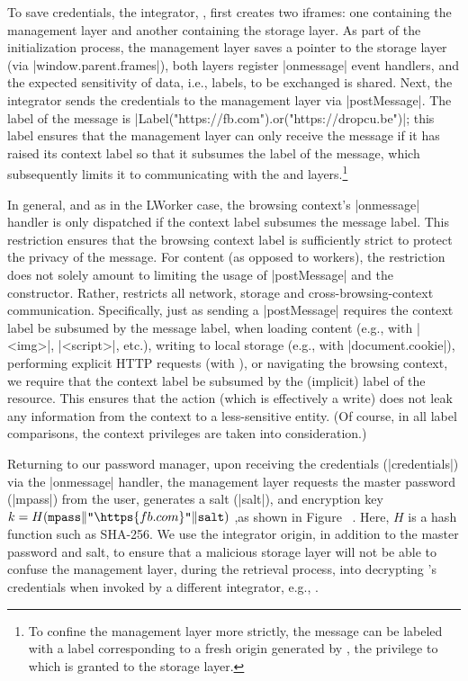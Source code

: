 %
To save credentials, the integrator, , first creates two
iframes: one containing the  management layer and
another containing the  storage layer.
%
As part of the initialization process, the management layer saves a
pointer to the storage layer (via \js|window.parent.frames|), both
layers register \js|onmessage| event handlers, and the expected
sensitivity of data, i.e., labels, to be exchanged is shared.
%
Next, the integrator sends the credentials to the management
layer via \js|postMessage|.
%
The label of the message is
\js|Label("https://fb.com").or("https://dropcu.be")|; this label
ensures that the management layer can only receive the message if it
has raised its context label so that it subsumes the label of the
message, which subsequently limits it to communicating with the
 and  layers.\footnote{
  To confine the management layer more strictly, the message can be
  labeled with a label corresponding to a fresh origin generated by
  , the privilege to which is granted to the storage
  layer. 
}

In general, and as in the LWorker case, the browsing context's
\js|onmessage| handler is only dispatched if the context label
subsumes the message label.
%
This restriction ensures that the browsing context label is
sufficiently strict to protect the privacy of the message.
%
For content (as opposed to workers), the restriction does not solely
amount to limiting the usage of \js|postMessage| and the \xhr{}
constructor.
%
Rather, \sys{} restricts all network, storage and
cross-browsing-context communication.
%
Specifically, just as sending a \js|postMessage| requires the context
label be subsumed by the message label, when loading content (e.g.,
with \js|<img>|, \js|<script>|, etc.), writing to local storage (e.g.,
with \js|document.cookie|), performing explicit HTTP requests (with
\xhr{}), or navigating the browsing context, we require that the
context label be subsumed by the (implicit) label of the resource.
%
This ensures that the action (which is effectively a write) does not
leak any information from the context to a less-sensitive entity.
%
(Of course, in all label comparisons, the context privileges are taken
into consideration.)
%
 
Returning to our password manager, upon receiving the credentials
(\js|credentials|) via the \js|onmessage| handler, the management
layer requests the master password (\js|mpass|) from the user, 
generates a salt (\js|salt|), and encryption key $k =
H(\texttt{mpass}\|\texttt{"}\https{fb.com}\texttt{"}\|\texttt{salt})$
\iffigures
\ifcompletefigures
,as shown in Figure~
\fi
\fi
.
%
Here, $H$ is a hash function such as SHA-256.
%
We use the integrator origin, in addition to the master password and
salt, to ensure that a malicious storage layer will not be able to
confuse the management layer, during the retrieval process, into
decrypting 's credentials when invoked by a different
integrator, e.g., .

